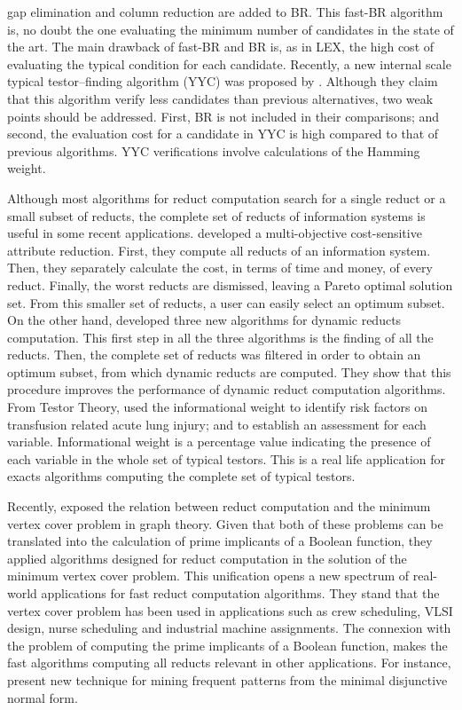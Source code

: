 \documentclass[authoryear,preprint,review,12pt]{elsarticle}
\begin{document}
  gap elimination and column reduction are added to BR. This fast-BR algorithm is, no doubt the one 
  evaluating the minimum number of candidates in the state of the art. The main drawback of fast-BR and 
  BR is, as in LEX, the high cost of evaluating the typical condition for each candidate.
  Recently, a new internal scale typical testor--finding algorithm (YYC) was proposed by \cite{Alba14}. 
  Although they claim that this algorithm verify less candidates than previous alternatives, two weak points should
  be addressed. First, BR is not included in their comparisons; and second, the evaluation cost for a candidate
  in YYC is high compared to that of previous algorithms. YYC verifications involve calculations of the 
  Hamming weight.
    
  Although most algorithms for reduct computation search for a single reduct or a small subset of reducts, 
  the complete set of reducts of information systems is useful in some recent applications. \cite{Xu2013}
  developed a multi-objective cost-sensitive attribute reduction. First, they compute all reducts of an 
  information system. Then, they separately calculate the cost, in terms of time and money, of every reduct. 
  Finally, the worst reducts are dismissed, leaving a Pareto optimal solution set. From this smaller set of 
  reducts, a user can easily select an optimum subset. On the other hand, \cite{Mukamakuza2014} developed 
  three new algorithms for dynamic reducts computation. 
  This first step in all the three algorithms is the finding of all the 
  reducts. Then, the complete set of reducts was filtered in order to obtain an optimum subset, from which 
  dynamic reducts are computed. They show that this procedure improves the performance of dynamic reduct 
  computation algorithms.	
  From Testor Theory, \cite{Torres2014} used the informational weight to identify risk factors on transfusion 
  related acute lung injury; and to establish an assessment for each variable.  Informational weight is 
  a percentage value indicating the presence of each variable in the whole set of typical testors. This is 
  a real life application for exacts algorithms computing the complete set of typical testors.	
	
  Recently, \cite{chen2015} exposed the relation between reduct computation and the minimum vertex cover
  problem in graph theory. Given that both of these problems can be translated into the calculation of
  prime implicants of a Boolean function, they applied algorithms designed for reduct computation in the
  solution of the minimum vertex cover problem. This unification opens a new spectrum of real-world applications
  for fast reduct computation algorithms. They stand that the vertex cover problem has been used in applications 
  such as crew scheduling, VLSI design, nurse scheduling and industrial machine assignments.
  The connexion with the problem of computing the prime implicants of a Boolean function, makes the fast 
  algorithms computing all reducts relevant in other applications. For instance, \cite{Li2015} present 
  new technique for mining frequent patterns from the minimal disjunctive normal form.
\end{document}
